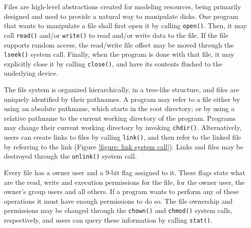 \documentclass[10pt,a4paper]{article}
\begin{document}
Files are high-level abstractions created for modeling resources, being primarily designed and used to provide a natural way to manipulate disks. One program that wants to manipulate a file shall first open it by calling \texttt{open()}. Then, it may call \texttt{read()} and/or \texttt{write()} to read and/or write data to the file. If the file supports random access, the read/write file offset may be moved through the \texttt{lseek()} system call. Finally, when the program is done with that file, it may explicitly close it by calling \texttt{close()}, and have its contents flushed to the underlying device.

The file system is organized hierarchically, in a tree-like structure, and files are uniquely identified by their pathnames. A program may refer to a file either by using an absolute pathname, which starts in the root directory; or by using a relative pathname to the current working directory of the program. Programs may change their current working directory by invoking \texttt{chdir()}. Alternatively, users can create links to files by calling \texttt{link()}, and then refer to the linked file by referring to the link (Figure \ref{figure: link system call}). Links and files may be destroyed through the \texttt{unlink()} system call.

Every file has a owner user and a 9-bit flag assigned to it. These flags state what are the read, write and execution permissions for the file, for the owner user, the owner's group users and all others. If a program wants to perform any of these operations it must have enough permissions to do so. The file ownership and permissions may be changed through the \texttt{chown()} and \texttt{chmod()} system calls, respectively, and users can query these information by calling \texttt{stat()}.
\end{document}
